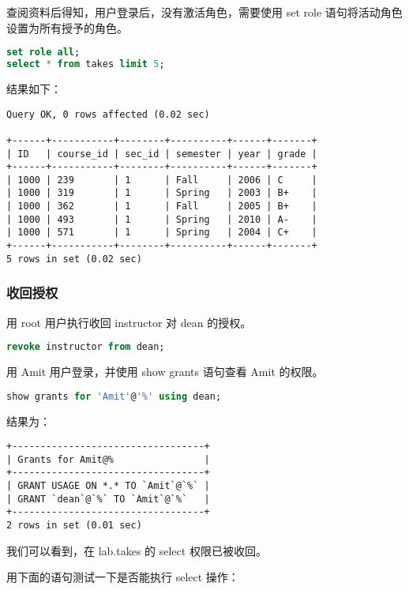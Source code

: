 \documentclass{article}
\begin{document}
查阅资料后得知，用户登录后，没有激活角色，需要使用 set role 语句将活动角色设置为所有授予的角色。

\begin{lstlisting}[language=sql]
set role all;
select * from takes limit 5;
\end{lstlisting}

结果如下：

\begin{lstlisting}
Query OK, 0 rows affected (0.02 sec)

+------+-----------+--------+----------+------+-------+
| ID   | course_id | sec_id | semester | year | grade |
+------+-----------+--------+----------+------+-------+
| 1000 | 239       | 1      | Fall     | 2006 | C     |
| 1000 | 319       | 1      | Spring   | 2003 | B+    |
| 1000 | 362       | 1      | Fall     | 2005 | B+    |
| 1000 | 493       | 1      | Spring   | 2010 | A-    |
| 1000 | 571       | 1      | Spring   | 2004 | C+    |
+------+-----------+--------+----------+------+-------+
5 rows in set (0.02 sec)
\end{lstlisting}

\subsubsection{收回授权}

用 root 用户执行收回 instructor 对 dean 的授权。

\begin{lstlisting}[language=sql]
revoke instructor from dean;
\end{lstlisting}

用 Amit 用户登录，并使用 show grants 语句查看 Amit 的权限。

\begin{lstlisting}[language=sql]
show grants for 'Amit'@'%' using dean;
\end{lstlisting}

结果为：

\begin{lstlisting}
+----------------------------------+
| Grants for Amit@%                |
+----------------------------------+
| GRANT USAGE ON *.* TO `Amit`@`%` |
| GRANT `dean`@`%` TO `Amit`@`%`   |
+----------------------------------+
2 rows in set (0.01 sec)
\end{lstlisting}

我们可以看到，在 lab.takes 的 select 权限已被收回。

用下面的语句测试一下是否能执行 select 操作：
\end{document}
